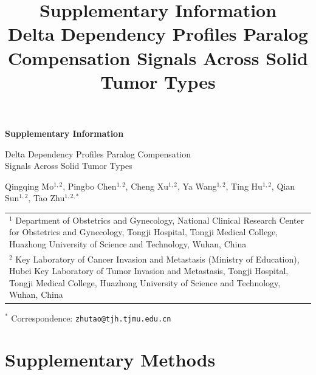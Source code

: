 \documentclass[11pt,a4paper]{article}
\title{\textbf{Supplementary Information}\\[0.3em]
\large Delta Dependency Profiles Paralog Compensation Signals Across Solid Tumor Types}
\author{}
\date{}
\begin{document}
\begin{center}
{\LARGE\bfseries Supplementary Information\par}
\vspace{0.5em}
{\large Delta Dependency Profiles Paralog Compensation\\[0.2em] Signals Across Solid Tumor Types\par}
\vspace{1.2em}

{\large Qingqing Mo$^{1,2}$, Pingbo Chen$^{1,2}$, Cheng Xu$^{1,2}$, Ya Wang$^{1,2}$, Ting Hu$^{1,2}$, Qian Sun$^{1,2}$, Tao Zhu$^{1,2,\ast}$\par}
\vspace{0.6em}

{\small
\begin{tabular}{p{}}
$^{1}$ Department of Obstetrics and Gynecology, National Clinical Research Center for Obstetrics and Gynecology, Tongji Hospital, Tongji Medical College, Huazhong University of Science and Technology, Wuhan, China\\[0.3em]
$^{2}$ Key Laboratory of Cancer Invasion and Metastasis (Ministry of Education), Hubei Key Laboratory of Tumor Invasion and Metastasis, Tongji Hospital, Tongji Medical College, Huazhong University of Science and Technology, Wuhan, China
\end{tabular}\par}
\vspace{0.6em}

{\small $^{\ast}$ Correspondence: \texttt{zhutao@tjh.tjmu.edu.cn}\par}
\end{center}

\newpage
\tableofcontents
\newpage

\section{Supplementary Methods}
\end{document}
